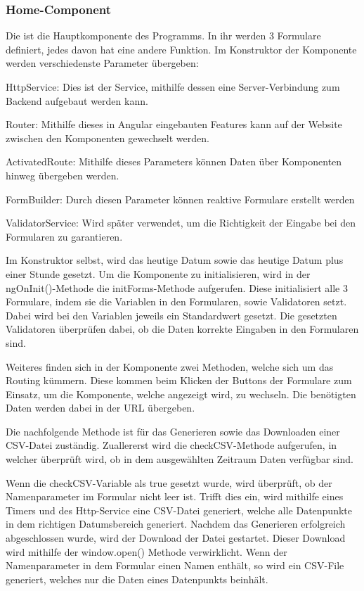 \subsubsection{Home-Component}
Die ist die Hauptkomponente des Programms. In ihr werden 3 Formulare definiert, jedes davon hat eine andere Funktion. Im Konstruktor der Komponente werden verschiedenste Parameter übergeben:
 
\begin{compactitem}
    \item HttpService: Dies ist der Service, mithilfe dessen eine Server-Verbindung zum Backend aufgebaut werden kann.   
    \item Router: Mithilfe dieses in Angular eingebauten Features kann auf der Website zwischen den Komponenten gewechselt werden.       
    \item ActivatedRoute: Mithilfe dieses Parameters können Daten über Komponenten hinweg übergeben werden.   
    \item FormBuilder: Durch diesen Parameter können reaktive Formulare erstellt werden
    \item ValidatorService: Wird später verwendet, um die Richtigkeit der Eingabe bei den Formularen zu garantieren.
\end{compactitem}
 
Im Konstruktor selbst, wird das heutige Datum sowie das heutige Datum plus einer Stunde gesetzt.
Um die Komponente zu initialisieren, wird in der ngOnInit()-Methode die initForms-Methode aufgerufen. Diese initialisiert alle 3 Formulare, indem sie die Variablen in den Formularen, sowie Validatoren setzt. Dabei wird bei den Variablen jeweils ein Standardwert gesetzt. Die gesetzten Validatoren überprüfen dabei, ob die Daten korrekte Eingaben in den Formularen sind.
 
Weiteres finden sich in der Komponente zwei Methoden, welche sich um das Routing kümmern. Diese kommen beim Klicken der Buttons der Formulare zum Einsatz, um die Komponente, welche angezeigt wird, zu wechseln. Die benötigten Daten werden dabei in der URL übergeben.
 
Die nachfolgende Methode ist für das Generieren sowie das Downloaden einer CSV-Datei zuständig. Zuallererst wird die checkCSV-Methode aufgerufen, in welcher überprüft wird, ob in dem ausgewählten Zeitraum Daten verfügbar sind.
 
Wenn die checkCSV-Variable als true gesetzt wurde, wird überprüft, ob der Namenparameter im Formular nicht leer ist. Trifft dies ein, wird mithilfe eines Timers und des Http-Service eine CSV-Datei generiert, welche alle Datenpunkte in dem richtigen Datumsbereich generiert. Nachdem das Generieren erfolgreich abgeschlossen wurde, wird der Download der Datei gestartet. Dieser Download wird mithilfe der window.open() Methode verwirklicht. Wenn der Namenparameter in dem Formular einen Namen enthält, so wird ein CSV-File generiert, welches nur die Daten eines Datenpunkts beinhält.
 
